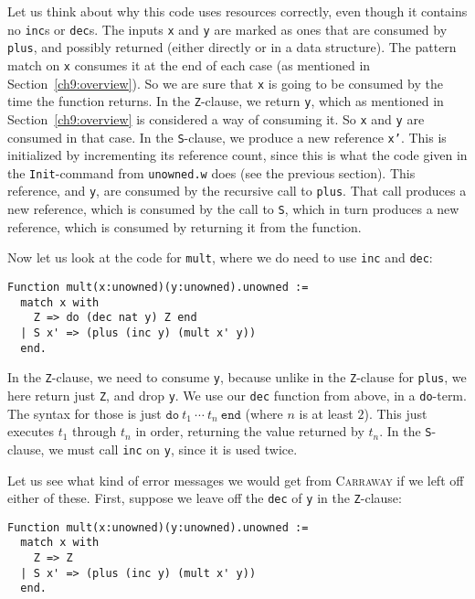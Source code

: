 \documentclass{book}[12pt]
\newcommand{\carraway}[0]{\textsc{Carraway}\xspace}
\begin{document}
\noindent Let us think about why this code uses resources correctly,
even though it contains no \texttt{inc}s or \texttt{dec}s.  The inputs
\texttt{x} and \texttt{y} are marked as ones that are consumed by
\texttt{plus}, and possibly returned (either directly or in a data
structure).  The pattern match on \texttt{x} consumes it at the end of
each case (as mentioned in Section~\ref{ch9:overview}).  So we are
sure that \texttt{x} is going to be consumed by the time the function
returns.  In the \texttt{Z}-clause, we return \texttt{y}, which as
mentioned in Section~\ref{ch9:overview} is considered a way of
consuming it.  So \texttt{x} and \texttt{y} are consumed in that case.
In the \texttt{S}-clause, we produce a new reference \texttt{x'}.
This is initialized by incrementing its reference count, since this is
what the code given in the \texttt{Init}-command from
\texttt{unowned.w} does (see the previous section).  This reference,
and \texttt{y}, are consumed by the recursive call to \texttt{plus}.
That call produces a new reference, which is consumed by the call to
\texttt{S}, which in turn produces a new reference, which is consumed
by returning it from the function.

Now let us look at the code for \texttt{mult}, where we do need
to use \texttt{inc} and \texttt{dec}:

\begin{verbatim}
Function mult(x:unowned)(y:unowned).unowned :=
  match x with
    Z => do (dec nat y) Z end
  | S x' => (plus (inc y) (mult x' y))
  end.
\end{verbatim}

\noindent In the \texttt{Z}-clause, we need to consume \texttt{y},
because unlike in the \texttt{Z}-clause for \texttt{plus}, we here
return just \texttt{Z}, and drop \texttt{y}.  We use our \texttt{dec}
function from above, in a \texttt{do}-term.  The syntax for those is
just $\texttt{do}\ t_1\ \cdots\ t_n\ \texttt{end}$ (where $n$ is at
least $2$).  This just executes $t_1$ through $t_n$ in order,
returning the value returned by $t_n$.  In the \texttt{S}-clause,
we must call \texttt{inc} on \texttt{y}, since it is used twice.

Let us see what kind of error messages we would get from \carraway if
we left off either of these.  First, suppose we leave off the
\texttt{dec} of \texttt{y} in the \texttt{Z}-clause:

\begin{verbatim}
Function mult(x:unowned)(y:unowned).unowned :=
  match x with
    Z => Z
  | S x' => (plus (inc y) (mult x' y))
  end.
\end{verbatim}
\end{document}
